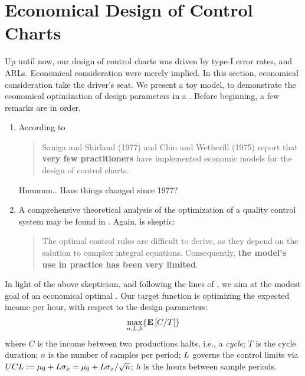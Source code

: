 \section{Economical Design of Control Charts}
\label{sec:economical_considerations}

Up until now, our design of control charts was driven by type-I error rates, and ARLs. 
Economical consideration were merely implied.
In this section, economical consideration take the driver's seat. 
We present a toy model, to demonstrate the economical optimization of design parameters in a \barxChart. 
Before beginning, a few remarks are in order. 

\begin{remark}
\noindent
\begin{enumerate}
\item According to \cite{montgomery_introduction_2007} 
\begin{quote}
Saniga and Shirland (1977) and Chiu and Wetherill (1975) report that \textbf{very few practitioners} have implemented economic models for the design of control charts.
\end{quote}
Hmmmm.. Have things changed since 1977?
\item A comprehensive theoretical analysis of the optimization of a quality control system may be found in \cite{girshick_bayes_1952}. Again, \cite{montgomery_introduction_2007} is skeptic:
\begin{quote}
The optimal control rules are difficult to derive, as they depend on the solution to complex integral equations. Consequently, \textbf{the model’s use in practice has been very limited}.
\end{quote}
\end{enumerate}
\end{remark}

In light of the above skepticism, and following the lines of \cite{duncan_economic_1956}, we aim at the modest goal of an economical optimal \barxChart. 
Our target function is optimizing the expected income per hour, with respect to the design parameters:
\begin{align}
\label{eq:optimal_design}
	\max_{n,L,h}\{ \mathbf{E}\left[ C/T \right] \}
\end{align}
where $C$ is the income between two productions halts, i.e., a \emph{cycle};
$T$ is the cycle duration;
$n$ is the number of samples per period;
$L$ governs the control limits via $UCL:= \mu_0+ L \sigma_{\bar{x}}= \mu_0+ L \sigma_x / \sqrt{n}$;
$h$ is the hours between sample periods. 

